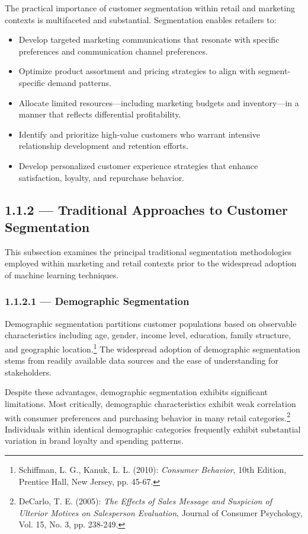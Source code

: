 \documentclass[12pt,a4paper,oneside]{report}
\begin{document}
The practical importance of customer segmentation within retail and marketing contexts is multifaceted and substantial. Segmentation enables retailers to:
\begin{itemize}
    \item Develop targeted marketing communications that resonate with specific preferences and communication channel preferences.
    \item Optimize product assortment and pricing strategies to align with segment-specific demand patterns.
    \item Allocate limited resources—including marketing budgets and inventory—in a manner that reflects differential profitability.
    \item Identify and prioritize high-value customers who warrant intensive relationship development and retention efforts.
    \item Develop personalized customer experience strategies that enhance satisfaction, loyalty, and repurchase behavior.
\end{itemize}

\subsection{1.1.2 — Traditional Approaches to Customer Segmentation}

This subsection examines the principal traditional segmentation methodologies employed within marketing and retail contexts prior to the widespread adoption of machine learning techniques.

\subsubsection{1.1.2.1 — Demographic Segmentation}

Demographic segmentation partitions customer populations based on observable characteristics including age, gender, income level, education, family structure, and geographic location.\footnote{Schiffman, L. G., Kanuk, L. L. (2010): \textit{Consumer Behavior}, 10th Edition, Prentice Hall, New Jersey, pp. 45-67.} The widespread adoption of demographic segmentation stems from readily available data sources and the ease of understanding for stakeholders.

Despite these advantages, demographic segmentation exhibits significant limitations. Most critically, demographic characteristics exhibit weak correlation with consumer preferences and purchasing behavior in many retail categories.\footnote{DeCarlo, T. E. (2005): \textit{The Effects of Sales Message and Suspicion of Ulterior Motives on Salesperson Evaluation}, Journal of Consumer Psychology, Vol. 15, No. 3, pp. 238-249.} Individuals within identical demographic categories frequently exhibit substantial variation in brand loyalty and spending patterns.
\end{document}
